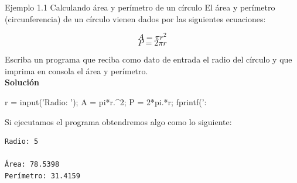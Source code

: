 \begin{ejemplo}{Ejemplo 1.1 Calculando área y perímetro de un círculo}
El área y perímetro (circunferencia) de un círculo vienen dados por las 
siguientes ecuaciones:

$$ A = \pi r^2 $$
$$ P = 2 \pi r $$

Escriba un programa que reciba como dato de entrada el radio del 
círculo y que imprima en consola el área y perímetro. \\

\textbf{Solución} \\

\begin{matlab}
r = input('Radio: ');
A = pi*r.^2;
P = 2*pi.*r;
fprintf(': %
\end{matlab}

Si ejecutamos el programa obtendremos algo como lo siguiente:

\begin{verbatim}
Radio: 5

Área: 78.5398 
Perímetro: 31.4159 
\end{verbatim}

\end{ejemplo} 

  \\  

